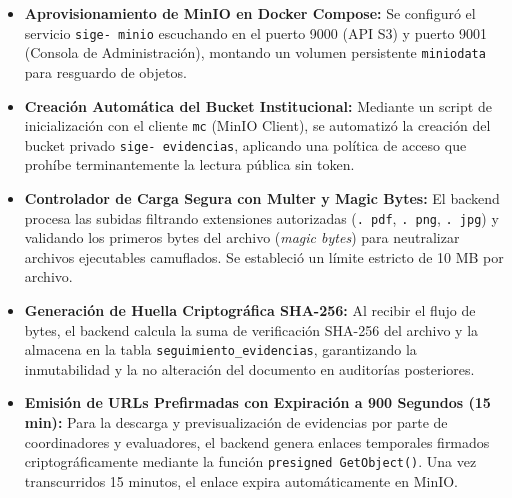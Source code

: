 \documentclass[12pt,a4paper]{article}
\begin{document}
\begin{itemize}[leftmargin=1.5em, itemsep=4pt]
    \item \textbf{Aprovisionamiento de MinIO en Docker Compose:} Se configuró el servicio \texttt{sige- minio} escuchando en el puerto 9000 (API S3) y puerto 9001 (Consola de Administración), montando un volumen persistente \texttt{miniodata} para resguardo de objetos.
    \item \textbf{Creación Automática del Bucket Institucional:} Mediante un script de inicialización con el cliente \texttt{mc} (MinIO Client), se automatizó la creación del bucket privado \texttt{sige- evidencias}, aplicando una política de acceso que prohíbe terminantemente la lectura pública sin token.
    \item \textbf{Controlador de Carga Segura con Multer y Magic Bytes:} El backend procesa las subidas filtrando extensiones autorizadas (\texttt{. pdf}, \texttt{. png}, \texttt{. jpg}) y validando los primeros bytes del archivo (\textit{magic bytes}) para neutralizar archivos ejecutables camuflados. Se estableció un límite estricto de 10 MB por archivo.
    \item \textbf{Generación de Huella Criptográfica SHA-256:} Al recibir el flujo de bytes, el backend calcula la suma de verificación SHA-256 del archivo y la almacena en la tabla \texttt{seguimiento\_\allowbreak   evidencias}, garantizando la inmutabilidad y la no alteración del documento en auditorías posteriores.
    \item \textbf{Emisión de URLs Prefirmadas con Expiración a 900 Segundos (15 min):} Para la descarga y previsualización de evidencias por parte de coordinadores y evaluadores, el backend genera enlaces temporales firmados criptográficamente mediante la función \texttt{presigned GetObject()}. Una vez transcurridos 15 minutos, el enlace expira automáticamente en MinIO.
\end{itemize}
\end{document}
